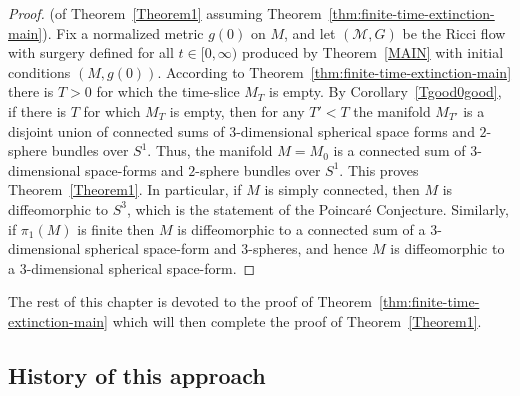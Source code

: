 \begin{proof}(of Theorem~\ref{Theorem1} assuming
Theorem~\ref{thm:finite-time-extinction-main}).
Fix a normalized metric $g(0)$ on $M$, and let
$({\mathcal M},G)$ be the Ricci flow with surgery defined for all $t\in
[0,\infty)$ produced by Theorem~\ref{MAIN} with initial conditions $(M,g(0))$.
According to Theorem~\ref{thm:finite-time-extinction-main} there is $T>0$ for which the time-slice
$M_T$ is empty. By Corollary~\ref{Tgood0good}, if there is $T$ for which $M_T$
is empty, then for any $T'<T$ the manifold $M_{T'}$ is a disjoint union of
connected sums of $3$-dimensional spherical space forms and $2$-sphere bundles
over $S^1$. Thus, the manifold $M=M_0$ is a connected sum of $3$-dimensional
space-forms and $2$-sphere bundles over $S^1$. This proves
Theorem~\ref{Theorem1}. In particular, if $M$ is simply connected, then $M$ is
diffeomorphic to $S^3$, which is the statement of the Poincar\'e Conjecture.
Similarly, if $\pi_1(M)$ is finite then $M$ is diffeomorphic to a connected sum
of a $3$-dimensional spherical space-form and $3$-spheres, and hence $M$ is
diffeomorphic to a $3$-dimensional spherical space-form.
\end{proof}


The rest of this chapter is devoted to the proof of
Theorem~\ref{thm:finite-time-extinction-main} which will then complete the proof of
Theorem~\ref{Theorem1}.

\subsection{History of this approach}

